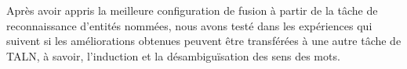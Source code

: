 \documentclass[a4paper,11pt,twoside]{article}
\begin{document}
%
%

Après avoir appris la meilleure configuration de fusion à partir de la tâche de reconnaissance d'entités nommées, nous avons testé dans les expériences qui suivent si les améliorations obtenues peuvent être transférées à une autre tâche de TALN, à savoir, l'induction et la désambiguïsation des sens des mots.
\end{document}
